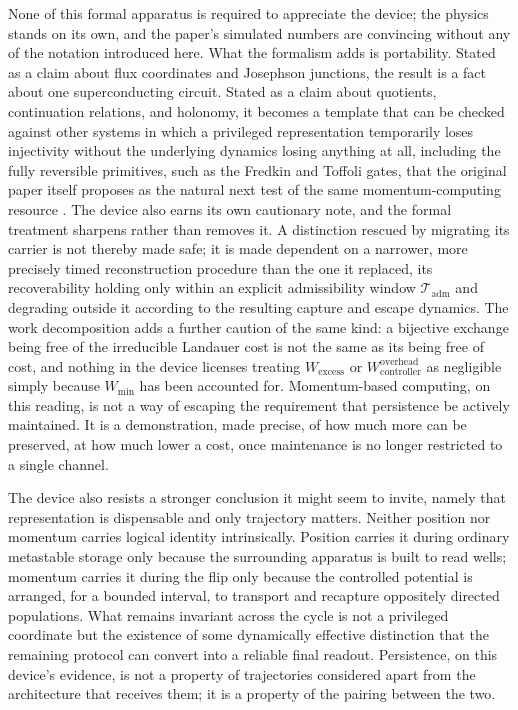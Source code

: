 \documentclass[11pt]{article}
\begin{document}
None of this formal apparatus is required to appreciate the device; the physics stands on its own, and the paper's simulated numbers are convincing without any of the notation introduced here. What the formalism adds is portability. Stated as a claim about flux coordinates and Josephson junctions, the result is a fact about one superconducting circuit. Stated as a claim about quotients, continuation relations, and holonomy, it becomes a template that can be checked against other systems in which a privileged representation temporarily loses injectivity without the underlying dynamics losing anything at all, including the fully reversible primitives, such as the Fredkin and Toffoli gates, that the original paper itself proposes as the natural next test of the same momentum-computing resource \cite{FredkinToffoli1982,Toffoli1980}. The device also earns its own cautionary note, and the formal treatment sharpens rather than removes it. A distinction rescued by migrating its carrier is not thereby made safe; it is made dependent on a narrower, more precisely timed reconstruction procedure than the one it replaced, its recoverability holding only within an explicit admissibility window $\mathcal T_{\mathrm{adm}}$ and degrading outside it according to the resulting capture and escape dynamics. The work decomposition adds a further caution of the same kind: a bijective exchange being free of the irreducible Landauer cost is not the same as its being free of cost, and nothing in the device licenses treating $W_{\mathrm{excess}}$ or $W_{\mathrm{controller}}^{\mathrm{overhead}}$ as negligible simply because $W_{\min}$ has been accounted for. Momentum-based computing, on this reading, is not a way of escaping the requirement that persistence be actively maintained. It is a demonstration, made precise, of how much more can be preserved, at how much lower a cost, once maintenance is no longer restricted to a single channel.

The device also resists a stronger conclusion it might seem to invite, namely that representation is dispensable and only trajectory matters. Neither position nor momentum carries logical identity intrinsically. Position carries it during ordinary metastable storage only because the surrounding apparatus is built to read wells; momentum carries it during the flip only because the controlled potential is arranged, for a bounded interval, to transport and recapture oppositely directed populations. What remains invariant across the cycle is not a privileged coordinate but the existence of some dynamically effective distinction that the remaining protocol can convert into a reliable final readout. Persistence, on this device's evidence, is not a property of trajectories considered apart from the architecture that receives them; it is a property of the pairing between the two.
\end{document}
